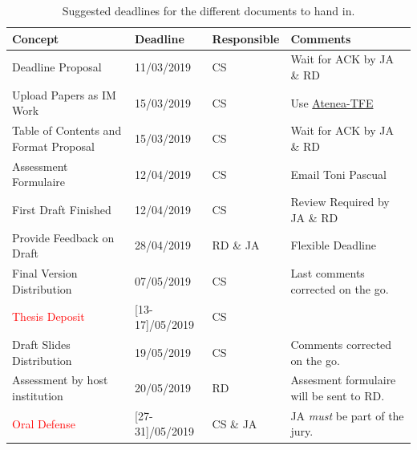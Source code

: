\documentclass{article}
\begin{document}
\begin{table}[h!]
    \centering
    \begin{tabular}{p{5cm}p{2.5cm}p{2cm}p{6.5cm}}
        \hline
        \rowcolor{gray!40}
        \textbf{Concept} & \textbf{Deadline} & \textbf{Responsible} & \textbf{Comments} \\[3pt]
        \hline 
        Deadline Proposal & 11/03/2019 & CS & Wait for ACK by JA \& RD \\[3pt]
        Upload Papers as IM Work & 15/03/2019 & CS & Use \href{https://atenea-tfe.upc.edu/login/index.php}{Atenea-TFE} \\[3pt]
        Table of Contents and Format Proposal & 15/03/2019 & CS & Wait for ACK by JA \& RD \\[3pt]
        Assessment Formulaire & 12/04/2019 & CS & Email Toni Pascual\\[3pt]
        First Draft Finished & 12/04/2019 & CS & Review Required by JA \& RD \\[3pt]
        Provide Feedback on Draft & 28/04/2019 & RD \& JA & Flexible Deadline \\[3pt]
        Final Version Distribution & 07/05/2019 & CS & Last comments corrected on the go. \\[3pt]
        \textcolor{red}{Thesis Deposit} & [13-17]/05/2019 & CS & \\[3pt]
        Draft Slides Distribution & 19/05/2019 & CS & Comments corrected on the go. \\[3pt]
        Assessment by host institution & 20/05/2019 & RD & Assesment formulaire will be sent to RD. \\[3pt]
        \textcolor{red}{Oral Defense} & [27-31]/05/2019 & CS \& JA & JA \emph{must} be part of the jury. \\[3pt]
        \hline
    \end{tabular}
    \caption{Suggested deadlines for the different documents to hand in.\label{tab:dates}}
\end{table}
\end{document}
